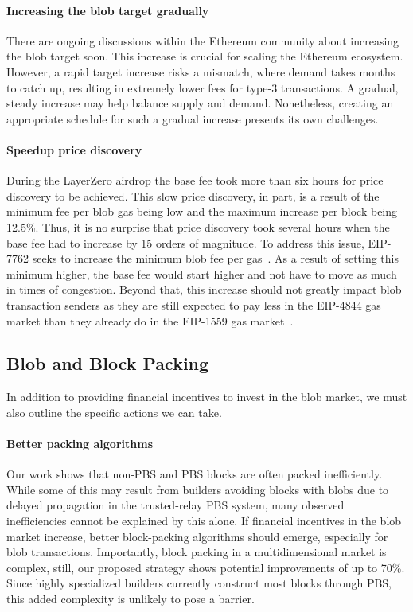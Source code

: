 \paragraph{Increasing the blob target gradually} There are ongoing discussions within the Ethereum community about increasing the blob target soon. This increase is crucial for scaling the Ethereum ecosystem. However, a rapid target increase risks a mismatch, where demand takes months to catch up, resulting in extremely lower fees for type-3 transactions. A gradual, steady increase may help balance supply and demand. Nonetheless, creating an appropriate schedule for such a gradual increase presents its own challenges.

\paragraph{Speedup price discovery} During the LayerZero airdrop the base fee took more than six hours for price discovery to be achieved. This slow price discovery, in part, is a result of the minimum fee per blob gas being low and the maximum increase per block being 12.5\%. Thus, it is no surprise that price discovery took several hours when the base fee had to increase by 15 orders of magnitude. To address this issue, EIP-7762 seeks to increase the minimum blob fee per gas~\parencite{resnick2024eip7762,resnick2024tweet}. As a result of setting this minimum higher, the base fee would start higher and not have to move as much in times of congestion. Beyond that, this increase should not greatly impact blob transaction senders as they are still expected to pay less in the EIP-4844 gas market than they already do in the EIP-1559 gas market~\parencite{dataalways2024minimumblobfees}.

\subsection{Blob and Block Packing}
In addition to providing financial incentives to invest in the blob market, we must also outline the specific actions we can take.

\paragraph{Better packing algorithms} Our work shows that non-PBS and PBS blocks are often packed inefficiently. While some of this may result from builders avoiding blocks with blobs due to delayed propagation in the trusted-relay PBS system, many observed inefficiencies cannot be explained by this alone. If financial incentives in the blob market increase, better block-packing algorithms should emerge, especially for blob transactions. Importantly, block packing in a multidimensional market is complex, still, our proposed strategy shows potential improvements of up to 70\%. Since highly specialized builders currently construct most blocks through PBS, this added complexity is unlikely to pose a barrier.

